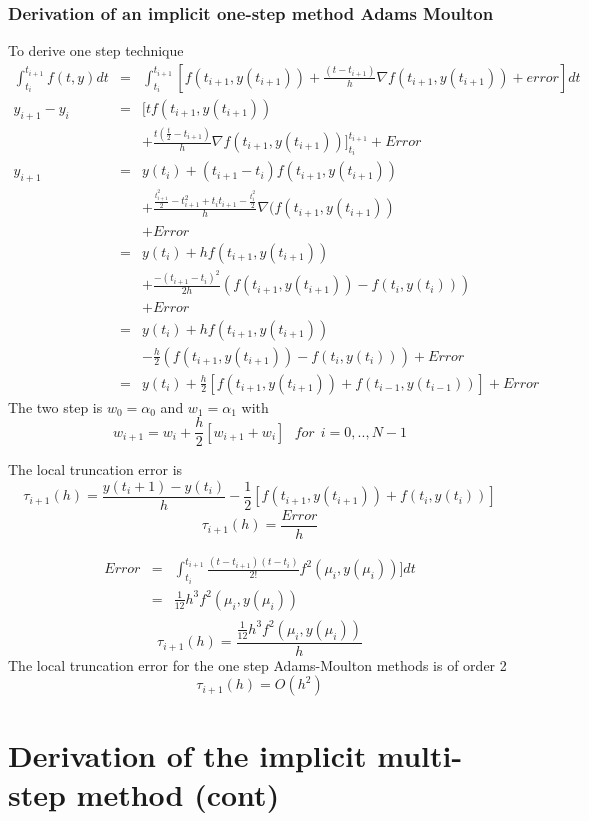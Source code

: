 \subsubsection{Derivation of an implicit one-step method Adams Moulton}
To derive one step  technique
\begin{eqnarray*}
\int_{t_i}^{t_{i+1}} f(t,y)dt &= &\int_{t_{i}}^{t_{i+1}}
[f(t_{i+1},y(t_{i+1}))+\frac{(t-t_{i+1})}{h}
\nabla f(t_{i+1},y(t_{i+1}))+error]dt \\
y_{i+1}-y_i &= &[t f(t_{i+1},y(t_{i+1})) \\
& & +\frac{t(\frac{t}{2}-t_{i+1})}{h}\nabla 
f(t_{i+1},y(t_{i+1}))]_{t_i}^{t_{i+1}}+Error \\
y_{i+1}&=&y(t_i)+ (t_{i+1}-t_i)f(t_{i+1},y(t_{i+1}))\\
& & +\frac{\frac{t_{i+1}^2}{2}-t_{i+1}^2+t_it_{i+1}-\frac{t_i^2}{2}}{h}\nabla(f(t_{i+1},y(t_{i+1}))\\
& & +Error\\
&=&y(t_i)+ hf(t_{i+1},y(t_{i+1}))\\
& & +\frac{-(t_{i+1}-t_i)^2}{2h}(f(t_{i+1},y(t_{i+1}))-f(t_{i},y(t_{i})))\\
& & +Error\\
&=&y(t_i)+ hf(t_{i+1},y(t_{i+1}))\\
& & -\frac{h}{2}(f(t_{i+1},y(t_{i+1}))-f(t_{i},y(t_{i})))+Error\\
&=&y(t_i)+ \frac{h}{2}[f(t_{i+1},y(t_{i+1}))+f(t_{i-1},y(t_{i-1}))]+Error
\end{eqnarray*}
The two step  is $w_0=\alpha_0$ and $w_1=\alpha_1$ with
\[w_{i+1}=w_i+\frac{h}{2}[w_{i+1}+w_{i}] \ \ \ for \ \ i=0,..,N-1 \]

The local truncation error is
\[\tau_{i+1}(h)=\frac{y(t_i+1)-y(t_i)}{h}-\frac{1}{2}[f(t_{i+1},y(t_{i+1}))+f(t_{i},y(t_{i})) ]  \]
\[\tau_{i+1}(h)=\frac{Error}{h}\]

\begin{eqnarray*}
Error &= &\int_{t_i}^{t_{i+1}} \frac{(t-t_{i+1})(t-t_{i})}{2!}f^2(\mu_i,y(\mu_i))]dt \\
&=&\frac{1}{12}h^3f^2(\mu_i,y(\mu_i))\\
\end{eqnarray*}
\[\tau_{i+1}(h)=\frac{\frac{1}{12}h^3f^2(\mu_i,y(\mu_i))}{h}\]
The local truncation error for the one step Adams-Moulton methods is of order 2
\[\tau_{i+1}(h)=O(h^2)\]


\section*{Derivation of the implicit multi-step method (cont)}

